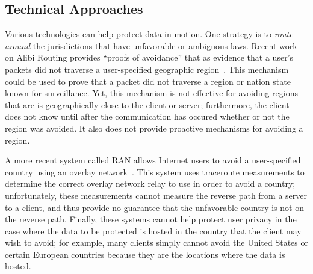 \subsection{Technical Approaches}
\label{sec:tech_motion}


Various technologies can help protect data in motion.  One strategy is to {\em
route around} the jurisdictions that have unfavorable or ambiguous laws.
Recent work on Alibi Routing provides ``proofs of avoidance'' that as evidence
that a user's packets did not traverse a user-specified geographic
region~\cite{levin2015alibi}.   This mechanism could be used to prove that a
packet did not traverse a region or nation state known for surveillance. Yet,
this mechanism is not effective for avoiding regions that are  is
geographically close to the client or server; furthermore,  the client does
not know until after the communication has occured whether or not the region
was avoided. It also does not provide proactive mechanisms for avoiding a
region. 

A more recent system called RAN allows  Internet users to avoid a
user-specified country using an overlay network~\cite{edmundson2017ran}.  This
system uses traceroute measurements to determine the correct overlay network
relay to use in order to avoid a country; unfortunately, these measurements
cannot measure the reverse path from a server to a client, and thus provide no
guarantee that the unfavorable country is not on the reverse path. Finally, these
systems cannot help protect user privacy in the case where the data to be protected
is hosted in the country that the client may wish to avoid; for example, many clients
simply cannot avoid the United States or certain European countries because they
are the locations where the data is hosted.


